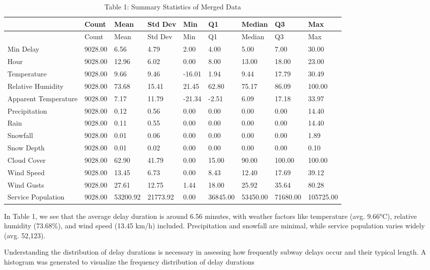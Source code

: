 \documentclass[
  letterpaper,
  DIV=11,
  numbers=noendperiod]{scrartcl}
\begin{document}
\begin{longtable}[]{@{}lllllllll@{}}
\caption{Table 1: Summary Statistics of Merged
Data}\label{T_7263b}\tabularnewline
\toprule\noalign{}
~ & Count & Mean & Std Dev & Min & Q1 & Median & Q3 & Max \\
\midrule\noalign{}
\endfirsthead
\toprule\noalign{}
~ & Count & Mean & Std Dev & Min & Q1 & Median & Q3 & Max \\
\midrule\noalign{}
\endhead
\bottomrule\noalign{}
\endlastfoot
Min Delay & 9028.00 & 6.56 & 4.79 & 2.00 & 4.00 & 5.00 & 7.00 & 30.00 \\
Hour & 9028.00 & 12.96 & 6.02 & 0.00 & 8.00 & 13.00 & 18.00 & 23.00 \\
Temperature & 9028.00 & 9.66 & 9.46 & -16.01 & 1.94 & 9.44 & 17.79 &
30.49 \\
Relative Humidity & 9028.00 & 73.68 & 15.41 & 21.45 & 62.80 & 75.17 &
86.09 & 100.00 \\
Apparent Temperature & 9028.00 & 7.17 & 11.79 & -21.34 & -2.51 & 6.09 &
17.18 & 33.97 \\
Precipitation & 9028.00 & 0.12 & 0.56 & 0.00 & 0.00 & 0.00 & 0.00 &
14.40 \\
Rain & 9028.00 & 0.11 & 0.55 & 0.00 & 0.00 & 0.00 & 0.00 & 14.40 \\
Snowfall & 9028.00 & 0.01 & 0.06 & 0.00 & 0.00 & 0.00 & 0.00 & 1.89 \\
Snow Depth & 9028.00 & 0.01 & 0.02 & 0.00 & 0.00 & 0.00 & 0.00 & 0.10 \\
Cloud Cover & 9028.00 & 62.90 & 41.79 & 0.00 & 15.00 & 90.00 & 100.00 &
100.00 \\
Wind Speed & 9028.00 & 13.45 & 6.73 & 0.00 & 8.43 & 12.40 & 17.69 &
39.12 \\
Wind Gusts & 9028.00 & 27.61 & 12.75 & 1.44 & 18.00 & 25.92 & 35.64 &
80.28 \\
Service Population & 9028.00 & 53200.92 & 21773.92 & 0.00 & 36845.00 &
53450.00 & 71680.00 & 105725.00 \\
\end{longtable}

In Table 1, we see that the average delay duration is around 6.56
minutes, with weather factors like temperature (avg. 9.66°C), relative
humidity (73.68\%), and wind speed (13.45 km/h) included. Precipitation
and snowfall are minimal, while service population varies widely (avg.
52,123).

Understanding the distribution of delay durations is necessary in
assessing how frequently subway delays occur and their typical length. A
histogram was generated to visualize the frequency distribution of delay
durations
\end{document}
